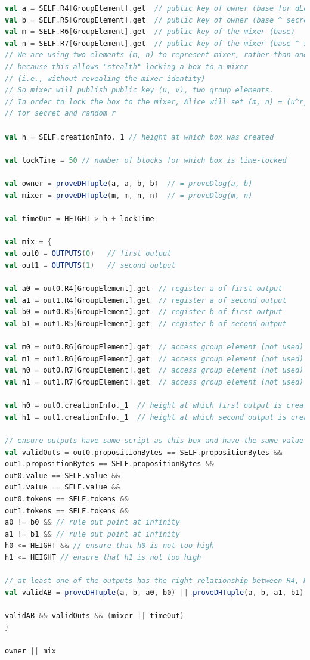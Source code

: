 \documentclass[runningheads]{llncs}
\begin{document}
\begin{lstlisting}[language=Scala,caption={Mix-script with Stealth Outsourceability},label=mixScript]
val a = SELF.R4[GroupElement].get  // public key of owner (base for dLog)
val b = SELF.R5[GroupElement].get  // public key of owner (base ^ secret)
val m = SELF.R6[GroupElement].get  // public key of the mixer (base)
val n = SELF.R7[GroupElement].get  // public key of the mixer (base ^ secret)
// We are using two elements (m, n) to represent mixer, rather than one
// because this allows "stealth" locking a box to a mixer
// (i.e., without revealing the mixer identity)
// So mixer will publish public key (u, v), two group elements.
// In order to lock the box to the mixer, Alice will set (m, n) = (u^r, v^r)
// for secret and random r

val h = SELF.creationInfo._1 // height at which box was created

val lockTime = 50 // number of blocks for which box is time-locked

val owner = proveDHTuple(a, a, b, b)  // = proveDlog(a, b)
val mixer = proveDHTuple(m, m, n, n)  // = proveDlog(m, n)

val timeOut = HEIGHT > h + lockTime

val mix = {
val out0 = OUTPUTS(0)   // first output
val out1 = OUTPUTS(1)   // second output

val a0 = out0.R4[GroupElement].get  // register a of first output
val a1 = out1.R4[GroupElement].get  // register a of second output
val b0 = out0.R5[GroupElement].get  // register b of first output
val b1 = out1.R5[GroupElement].get  // register b of second output

val m0 = out0.R6[GroupElement].get  // access group element (not used)
val m1 = out1.R6[GroupElement].get  // access group element (not used)
val n0 = out0.R7[GroupElement].get  // access group element (not used)
val n1 = out1.R7[GroupElement].get  // access group element (not used)

val h0 = out0.creationInfo._1  // height at which first output is created
val h1 = out1.creationInfo._1  // height at which second output is created

// ensure outputs have same script as this box and have the same value
val validOuts = out0.propositionBytes == SELF.propositionBytes &&
out1.propositionBytes == SELF.propositionBytes &&
out0.value == SELF.value &&
out1.value == SELF.value &&
out0.tokens == SELF.tokens &&
out1.tokens == SELF.tokens &&
a0 != b0 && // rule out point at infinity
a1 != b1 && // rule out point at infinity
h0 <= HEIGHT && // ensure that h0 is not too high
h1 <= HEIGHT // ensure that h1 is not too high

// at least one of the outputs has the right relationship between R4, R5
val validAB = proveDHTuple(a, b, a0, b0) || proveDHTuple(a, b, a1, b1)

validAB && validOuts && (mixer || timeOut)
}

owner || mix
\end{lstlisting}
\end{document}
